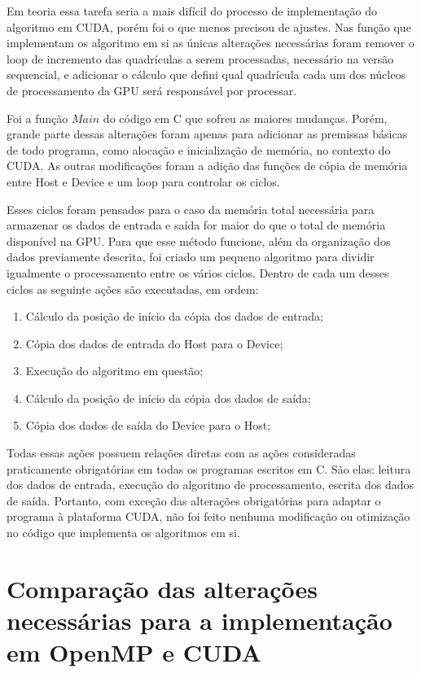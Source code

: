 Em teoria essa tarefa seria a mais difícil do processo de implementação do algoritmo em CUDA, porém foi o que menos precisou de ajustes. Nas função que implementam os algoritmo em si as únicas alterações necessárias foram remover o loop de incremento das quadrículas a serem processadas, necessário na versão sequencial, e adicionar o cálculo que defini qual quadrícula cada um dos núcleos de processamento da GPU será responsável por processar.

Foi a função $Main$ do código em C que sofreu as maiores mudanças. Porém, grande parte dessas alterações foram apenas para adicionar as premissas básicas de todo programa, como alocação e inicialização de memória, no contexto do CUDA. As outras modificações foram a adição das funções de cópia de memória entre Host e Device e um loop para controlar os ciclos.

Esses ciclos foram pensados para o caso da memória total necessária para armazenar os dados de entrada e saída for maior do que o total de memória disponível na GPU. Para que esse método funcione, além da organização dos dados previamente descrita, foi criado um pequeno algoritmo para dividir igualmente o processamento entre os vários ciclos. Dentro de cada um desses ciclos as seguinte ações são executadas, em ordem:

\begin{enumerate}
\item Cálculo da posição de início da cópia dos dados de entrada;
\item Cópia dos dados de entrada do Host para o Device;
\item Execução do algoritmo em questão;
\item Cálculo da posição de início da cópia dos dados de saída;
\item Cópia dos dados de saída do Device para o Host;
\end{enumerate}

Todas essas ações possuem relações diretas com as ações consideradas praticamente obrigatórias em todas os programas escritos em C. São elas: leitura dos dados de entrada, execução do algoritmo de processamento, escrita dos dados de saída. Portanto, com exceção das alterações obrigatórias para adaptar o programa à plataforma CUDA, não foi feito nenhuma modificação ou otimização no código que implementa os algoritmos em si.

\section{Comparação das alterações necessárias para a implementação em OpenMP e CUDA}

